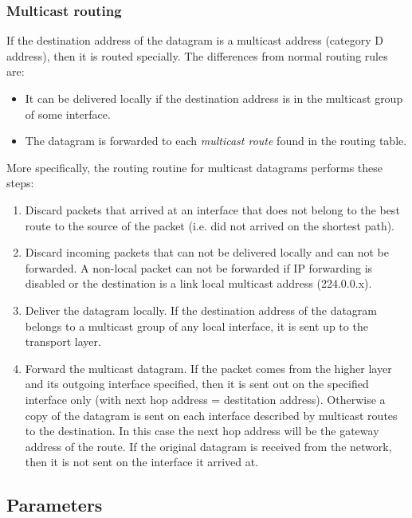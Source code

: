 \subsubsection*{Multicast routing}

If the destination address of the datagram is a multicast address (category D address),
then it is routed specially. The differences from normal routing rules are:
\begin{itemize}
  \item It can be delivered locally if the destination address
  is in the multicast group of some interface.
  \item The datagram is forwarded to each \emph{multicast route}
  found in the routing table.
\end{itemize}

More specifically, the routing routine for multicast datagrams performs these steps:
\begin{enumerate}
  \item Discard packets that arrived at an interface that does not belong
  to the best route to the source of the packet (i.e. did not arrived on the 
  shortest path).
  \item Discard incoming packets that can not be delivered locally and
  can not be forwarded.
  A non-local packet can not be forwarded if IP forwarding is disabled or the
  destination is a link local multicast address (224.0.0.x).
  \item Deliver the datagram locally. If the destination address of the
  datagram belongs to a multicast group of any local interface, it is sent
  up to the transport layer.
  \item Forward the multicast datagram. If the packet comes from the
  higher layer and its outgoing interface specified, then it is sent out
  on the specified interface only (with next hop address = destitation address).
  Otherwise a copy of the datagram is sent on each interface described by
  multicast routes to the destination. In this case the next hop address will be
  the gateway address of the route. If the original datagram is received
  from the network, then it is not sent on the interface it arrived at.
\end{enumerate}
        

\subsection{Parameters}

